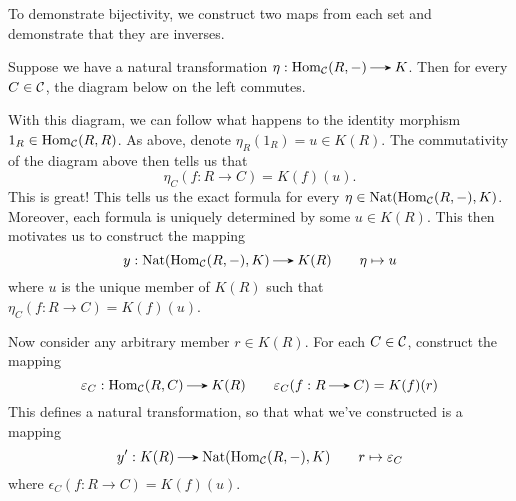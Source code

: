     \begin{prf}
        To demonstrate bijectivity, we construct two maps from each set and 
        demonstrate that they are inverses. 

        Suppose we have a natural transformation $\eta: \hom_{\cc}(R, -) \to K$. 
        Then for every $C \in \mathcal{C}$, the diagram below on the left commutes.
        \begin{center}
            \hspace{1cm}
            \hspace{1cm}
        \end{center}
        With this diagram, we can follow what happens to the identity morphism $1_R \in \operatorname{\mathrm{Hom}}_{\mathcal{C}}(R, R)$.
        As above, denote $\eta_R(1_R) = u \in K(R)$.
        The commutativity of the diagram above then tells us that 
        \[
            \eta_C(f: R \to C) = K(f)(u).
        \]
        This is great! This tells us the exact formula for every
        $\eta \in \operatorname{\mathrm{Nat}}(\operatorname{\mathrm{Hom}}_{\mathcal{C}}(R, -), K)$. Moreover, each 
        formula is uniquely determined by some $u \in K(R)$. 
        This then motivates us to construct the mapping 
        \[
            y: \text{Nat}(\hom_{\cc}(R, -), K) \to K(R)
            \qquad 
            \eta \mapsto u
        \]
        where $u$ is the unique member of $K(R)$ such that $\eta_C(f: R \to C) = K(f)(u)$.

        Now consider any arbitrary member $r \in K(R)$. For each $C \in 
        \mathcal{C}$, construct the mapping 
        \[
            \epsilon_C: \hom_{\cc}(R, C) \to K(R) 
            \qquad 
            \epsilon_C(f: R \to C) = K(f)(r)
        \]
        This defines a natural transformation, so that what we've constructed is a 
        mapping 
        \[
            y': K(R) \to \nat(\hom_{\cc}(R, -), K) \qquad r \mapsto \epsilon_C
        \]
        where $\epsilon_C(f: R \to C) = K(f)(u)$. 


\end{prf}
